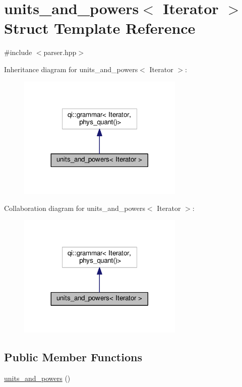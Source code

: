 \hypertarget{structunits__and__powers}{}\section{units\+\_\+and\+\_\+powers$<$ Iterator $>$ Struct Template Reference}
\label{structunits__and__powers}


{\ttfamily \#include $<$parser.\+hpp$>$}



Inheritance diagram for units\+\_\+and\+\_\+powers$<$ Iterator $>$\+:
\nopagebreak
\begin{figure}[H]
\begin{center}
\leavevmode
\includegraphics[width=224pt]{structunits__and__powers__inherit__graph}
\end{center}
\end{figure}


Collaboration diagram for units\+\_\+and\+\_\+powers$<$ Iterator $>$\+:
\nopagebreak
\begin{figure}[H]
\begin{center}
\leavevmode
\includegraphics[width=224pt]{structunits__and__powers__coll__graph}
\end{center}
\end{figure}
\subsection*{Public Member Functions}
\begin{DoxyCompactItemize}
\item 
\hyperlink{structunits__and__powers_abf55b2bb4c8700587a41023424ae31cf}{units\+\_\+and\+\_\+powers} ()
\end{DoxyCompactItemize}
